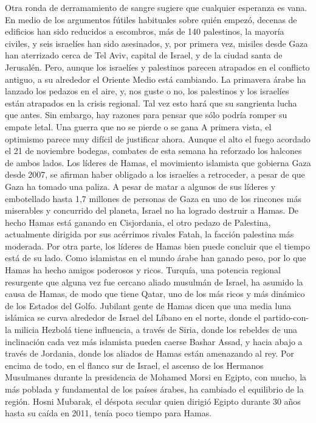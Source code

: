 Otra ronda de derramamiento de sangre sugiere que cualquier esperanza es vana.
En medio de los argumentos fútiles habituales sobre quién empezó, decenas de edificios han sido reducidos a escombros, más de 140 palestinos, la mayoría civiles, y seis israelíes han sido asesinados, y, por primera vez, misiles desde Gaza han aterrizado cerca de Tel Aviv, capital de Israel, y de la ciudad santa de Jerusalén.
Pero, aunque los israelíes y palestinos parecen atrapados en el conflicto antiguo, a su alrededor el Oriente Medio está cambiando.
La primavera árabe ha lanzado los pedazos en el aire, y, nos guste o no, los palestinos y los israelíes están atrapados en la crisis regional.
Tal vez esto hará que su sangrienta lucha que antes.
Sin embargo, hay razones para pensar que sólo podría romper su empate letal.
Una guerra que no se pierde o se gana
A primera vista, el optimismo parece muy difícil de justificar ahora.
Aunque el alto el fuego acordado el 21 de noviembre bodegas, combates de esta semana ha reforzado los halcones de ambos lados.
Los líderes de Hamas, el movimiento islamista que gobierna Gaza desde 2007, se afirman haber obligado a los israelíes a retroceder, a pesar de que Gaza ha tomado una paliza.
A pesar de matar a algunos de sus líderes y embotellado hasta 1,7 millones de personas de Gaza en uno de los rincones más miserables y concurrido del planeta, Israel no ha logrado destruir a Hamas.
De hecho Hamas está ganando en Cisjordania, el otro pedazo de Palestina, actualmente dirigida por sus acérrimos rivales Fatah, la facción palestina más moderada.
Por otra parte, los líderes de Hamas bien puede concluir que el tiempo está de su lado.
Como islamistas en el mundo árabe han ganado peso, por lo que Hamas ha hecho amigos poderosos y ricos.
Turquía, una potencia regional resurgente que alguna vez fue cercano aliado musulmán de Israel, ha asumido la causa de Hamas, de modo que tiene Qatar, uno de los más ricos y más dinámico de los Estados del Golfo.
Jubilant gente de Hamas dicen que una media luna islámica se curva alrededor de Israel del Líbano en el norte, donde el partido-con-la milicia Hezbolá tiene influencia, a través de Siria, donde los rebeldes de una inclinación cada vez más islamista pueden caerse Bashar Assad, y hacia abajo a través de Jordania, donde los aliados de Hamas están amenazando al rey.
Por encima de todo, en el flanco sur de Israel, el ascenso de los Hermanos Musulmanes durante la presidencia de Mohamed Morsi en Egipto, con mucho, la más poblada y fundamental de los países árabes, ha cambiado el equilibrio de la región.
Hosni Mubarak, el déspota secular quien dirigió Egipto durante 30 años hasta su caída en 2011, tenía poco tiempo para Hamas.
